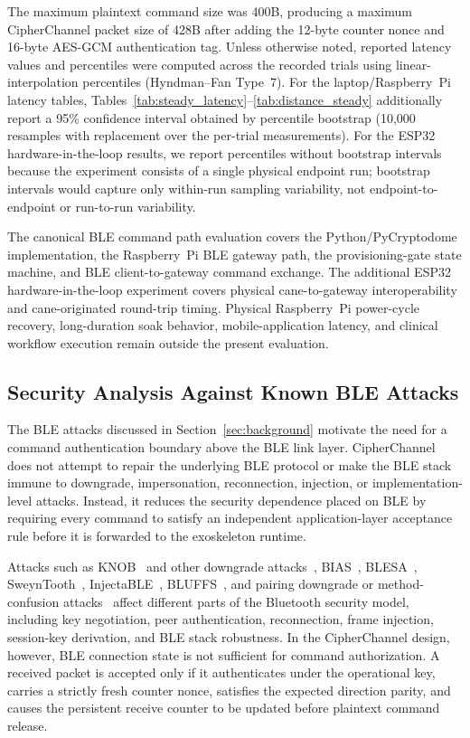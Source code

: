 \documentclass[journal]{IEEEtran}
\begin{document}
The maximum plaintext command size was 400B, producing a maximum CipherChannel packet size of 428B after adding the 12-byte counter nonce and 16-byte AES-GCM authentication tag. Unless otherwise noted, reported latency values and percentiles were computed across the recorded trials using linear-interpolation percentiles (Hyndman--Fan Type~7). For the laptop/Raspberry~Pi latency tables, Tables~\ref{tab:steady_latency}--\ref{tab:distance_steady} additionally report a 95\% confidence interval obtained by percentile bootstrap (10,000 resamples with replacement over the per-trial measurements). 
For the ESP32 hardware-in-the-loop results, we report percentiles without bootstrap intervals because the experiment consists of a single physical endpoint run; bootstrap intervals would capture only within-run sampling variability, not endpoint-to-endpoint or run-to-run variability.

The canonical BLE command path evaluation covers the Python/PyCryptodome implementation, the Raspberry~Pi BLE gateway path, the provisioning-gate state machine, and BLE client-to-gateway command exchange. The additional ESP32 hardware-in-the-loop experiment covers physical cane-to-gateway interoperability and cane-originated round-trip timing. Physical Raspberry~Pi power-cycle recovery, long-duration soak behavior, mobile-application latency, and clinical workflow execution remain outside the present evaluation.

\subsection{Security Analysis Against Known BLE Attacks}
\label{sec:attackcoverage}

The BLE attacks discussed in Section~\ref{sec:background} motivate the need for a command authentication boundary above the BLE link layer. CipherChannel does not attempt to repair the underlying BLE protocol or make the BLE stack immune to downgrade, impersonation, reconnection, injection, or implementation-level attacks. Instead, it reduces the security dependence placed on BLE by requiring every command to satisfy an independent application-layer acceptance rule before it is forwarded to the exoskeleton runtime.

Attacks such as KNOB~\cite{antonioli2020knob} and other downgrade attacks~\cite{zhang2020downgrade}, BIAS~\cite{antonioli2020bias}, BLESA~\cite{wu2020blesa}, SweynTooth~\cite{garbelini2020sweyntooth}, InjectaBLE~\cite{cayre2021injectable}, BLUFFS~\cite{antonioli2023bluffs}, and pairing downgrade or method-confusion attacks~\cite{tschirschnitz2021method} affect different parts of the Bluetooth security model, including key negotiation, peer authentication, reconnection, frame injection, session-key derivation, and BLE stack robustness. In the CipherChannel design, however, BLE connection state is not sufficient for command authorization. A received packet is accepted only if it authenticates under the operational key, carries a strictly fresh counter nonce, satisfies the expected direction parity, and causes the persistent receive counter to be updated before plaintext command release.
\end{document}
